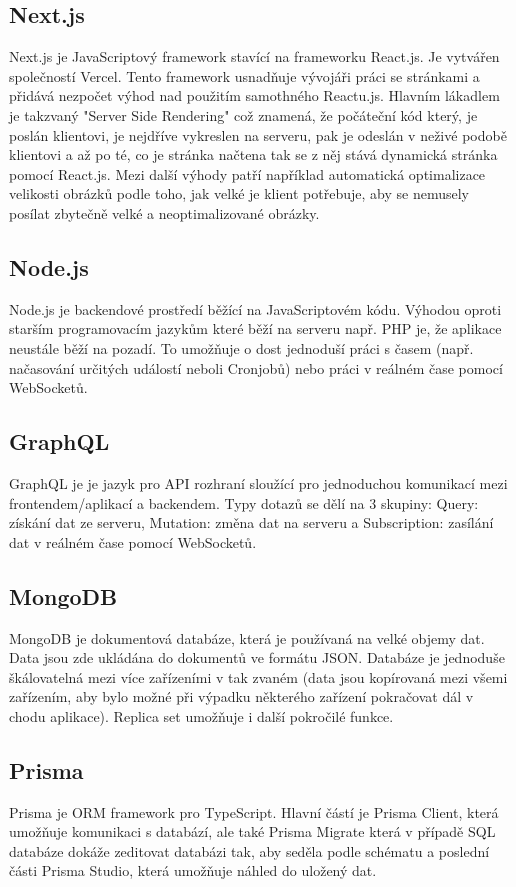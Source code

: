 \subsection{Next.js}
Next.js je JavaScriptový framework stavící na frameworku React.js. Je vytvářen společností Vercel. Tento framework usnadňuje vývojáři práci se stránkami a přidává nezpočet výhod nad použitím samothného Reactu.js. Hlavním lákadlem je takzvaný "Server Side Rendering" což znamená, že počáteční kód který, je poslán klientovi, je nejdříve vykreslen na serveru, pak je odeslán v neživé podobě klientovi a až po té, co je stránka načtena tak se z něj stává dynamická stránka pomocí React.js. Mezi další výhody patří například automatická optimalizace velikosti obrázků podle toho, jak velké je klient potřebuje, aby se nemusely posílat zbytečně velké a neoptimalizované obrázky.

\subsection{Node.js}
Node.js je backendové prostředí běžící na JavaScriptovém kódu. Výhodou oproti starším programovacím jazykům které běží na serveru např. PHP je, že aplikace neustále běží na pozadí. To umožňuje o dost jednoduší práci s časem (např. načasování určitých událostí neboli Cronjobů) nebo práci v reálném čase pomocí WebSocketů.

\subsection{GraphQL}
GraphQL je je jazyk pro API rozhraní sloužící pro jednoduchou komunikací mezi frontendem/aplikací a backendem. Typy dotazů se dělí na 3 skupiny: Query: získání dat ze serveru, Mutation: změna dat na serveru a Subscription: zasílání dat v reálném čase pomocí WebSocketů.

\subsection{MongoDB}
MongoDB je dokumentová databáze, která je používaná na velké objemy dat. Data jsou zde ukládána do dokumentů ve formátu JSON. Databáze je jednoduše škálovatelná mezi více zařízeními v tak zvaném  (data jsou kopírovaná mezi všemi zařízením, aby bylo možné při výpadku některého zařízení pokračovat dál v chodu aplikace). Replica set umožňuje i další pokročilé funkce.

\subsection{Prisma}
Prisma je ORM framework pro TypeScript. Hlavní částí je Prisma Client, která umožňuje komunikaci s databází, ale také Prisma Migrate která v případě SQL databáze dokáže zeditovat databázi tak, aby seděla podle schématu a poslední části Prisma Studio, která umožňuje náhled do uložený dat.\cite{Prisma}

